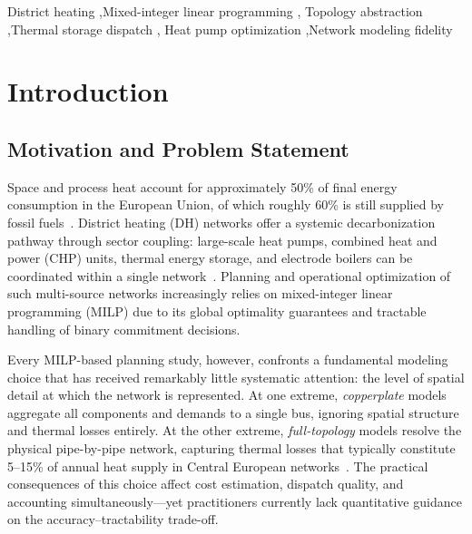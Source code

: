 \documentclass[review,3p]{elsarticle}
\begin{document}
\begin{frontmatter}
\begin{keyword}
District heating \sep Mixed-integer linear programming \sep
Topology abstraction \sep Thermal storage dispatch \sep
Heat pump optimization \sep Network modeling fidelity
\end{keyword}

\end{frontmatter}

\linenumbers

\section{Introduction}
\label{sec:introduction}

\subsection{Motivation and Problem Statement}
\label{sec:motivation}

Space and process heat account for approximately 50\% of final energy
consumption in the European Union, of which roughly 60\% is still
supplied by fossil fuels~\cite{EUheating2016}. District heating (DH)
networks offer a systemic decarbonization pathway through sector
coupling: large-scale heat pumps, combined heat and power (CHP) units,
thermal energy storage, and electrode boilers can be coordinated within
a single network~\cite{Lund2014_4GDH,Werner2017}. Planning and
operational optimization of such multi-source networks increasingly
relies on mixed-integer linear programming (MILP) due to its global
optimality guarantees and tractable handling of binary commitment
decisions.

Every MILP-based planning study, however, confronts a fundamental
modeling choice that has received remarkably little systematic
attention: the level of spatial detail at which the network is
represented. At one extreme, \emph{copperplate} models aggregate all
components and demands to a single bus, ignoring spatial structure and
thermal losses entirely. At the other extreme, \emph{full-topology}
models resolve the physical pipe-by-pipe network, capturing thermal
losses that typically constitute 5--15\% of annual heat supply in
Central European networks~\cite{Frederiksen2013,Talebi2016}. The
practical consequences of this choice affect cost estimation, dispatch
quality, and  accounting simultaneously---yet practitioners
currently lack quantitative guidance on the accuracy--tractability
trade-off.
\end{document}
